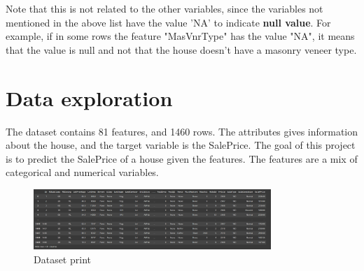 Note that this is not related to the other variables, since the variables not mentioned in the above list have the value 'NA' to indicate \textbf{null value}. For example, if in some rows the feature "MasVnrType" has the value "NA", it means that the value is null and not that the house doesn't have a masonry veneer type.

\section{Data exploration}
\label{sec:data_exploration}

The dataset contains 81 features, and 1460 rows. The attributes gives information about the house, and the target variable is the SalePrice. The goal of this project is to predict the SalePrice of a house given the features. The features are a mix of categorical and numerical variables.
\begin{figure}[h!]
    \centering
    \includegraphics[width=0.8\textwidth]{imgs/desc1.png}
    \caption{Dataset print}
    \label{fig:dataset_print}
\end{figure}

